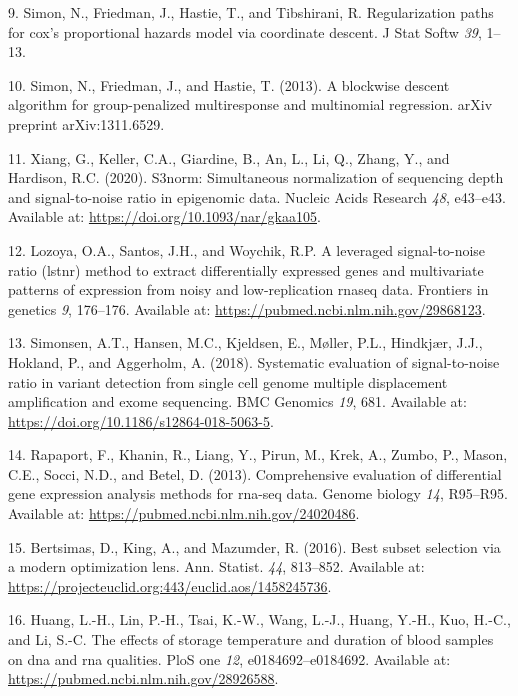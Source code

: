 \documentclass[
]{book}
\newenvironment{cslreferences}%
  {}%
  {\par}
\begin{document}
\begin{cslreferences}
\leavevmode\hypertarget{ref-Simon:2011aa}{}%
9. Simon, N., Friedman, J., Hastie, T., and Tibshirani, R. Regularization paths for cox's proportional hazards model via coordinate descent. J Stat Softw \emph{39}, 1--13.

\leavevmode\hypertarget{ref-Simon:2013aa}{}%
10. Simon, N., Friedman, J., and Hastie, T. (2013). A blockwise descent algorithm for group-penalized multiresponse and multinomial regression. arXiv preprint arXiv:1311.6529.

\leavevmode\hypertarget{ref-Xiang:2020aa}{}%
11. Xiang, G., Keller, C.A., Giardine, B., An, L., Li, Q., Zhang, Y., and Hardison, R.C. (2020). S3norm: Simultaneous normalization of sequencing depth and signal-to-noise ratio in epigenomic data. Nucleic Acids Research \emph{48}, e43--e43. Available at: \url{https://doi.org/10.1093/nar/gkaa105}.

\leavevmode\hypertarget{ref-Lozoya:2018aa}{}%
12. Lozoya, O.A., Santos, J.H., and Woychik, R.P. A leveraged signal-to-noise ratio (lstnr) method to extract differentially expressed genes and multivariate patterns of expression from noisy and low-replication rnaseq data. Frontiers in genetics \emph{9}, 176--176. Available at: \url{https://pubmed.ncbi.nlm.nih.gov/29868123}.

\leavevmode\hypertarget{ref-Simonsen:2018aa}{}%
13. Simonsen, A.T., Hansen, M.C., Kjeldsen, E., Møller, P.L., Hindkjær, J.J., Hokland, P., and Aggerholm, A. (2018). Systematic evaluation of signal-to-noise ratio in variant detection from single cell genome multiple displacement amplification and exome sequencing. BMC Genomics \emph{19}, 681. Available at: \url{https://doi.org/10.1186/s12864-018-5063-5}.

\leavevmode\hypertarget{ref-Rapaport:2013aa}{}%
14. Rapaport, F., Khanin, R., Liang, Y., Pirun, M., Krek, A., Zumbo, P., Mason, C.E., Socci, N.D., and Betel, D. (2013). Comprehensive evaluation of differential gene expression analysis methods for rna-seq data. Genome biology \emph{14}, R95--R95. Available at: \url{https://pubmed.ncbi.nlm.nih.gov/24020486}.

\leavevmode\hypertarget{ref-Bertsimas:2016aa}{}%
15. Bertsimas, D., King, A., and Mazumder, R. (2016). Best subset selection via a modern optimization lens. Ann. Statist. \emph{44}, 813--852. Available at: \url{https://projecteuclid.org:443/euclid.aos/1458245736}.

\leavevmode\hypertarget{ref-Huang:2017aa}{}%
16. Huang, L.-H., Lin, P.-H., Tsai, K.-W., Wang, L.-J., Huang, Y.-H., Kuo, H.-C., and Li, S.-C. The effects of storage temperature and duration of blood samples on dna and rna qualities. PloS one \emph{12}, e0184692--e0184692. Available at: \url{https://pubmed.ncbi.nlm.nih.gov/28926588}.


\end{cslreferences}
\end{document}
